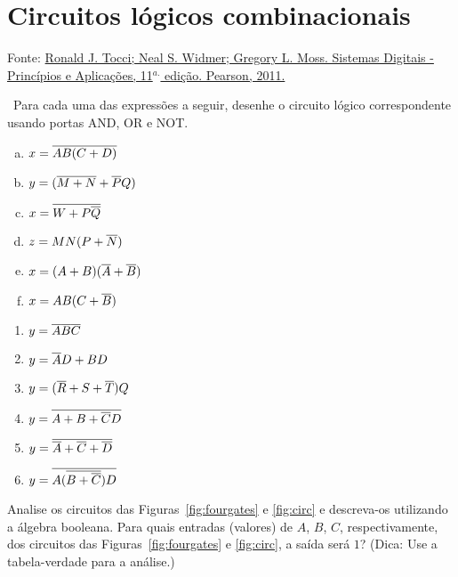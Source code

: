 \maketitle

\section*{Circuitos lógicos combinacionais}

\noindent Fonte:
\href{https://feituverava.bv3.digitalpages.com.br/users/publications/9788576059226/pages/_1}{Ronald
  J. Tocci; Neal S. Widmer; Gregory L. Moss. Sistemas Digitais -
  Princípios e Aplicações, 11$^{a.}$ edição. Pearson, 2011.}

\exercise~Para cada uma das expressões a seguir, desenhe o circuito
lógico correspondente usando portas AND, OR e NOT.

\begin{minipage}{.55\textwidth}
  \begin{enumerate}[(a),series=mylist]
  \item $x = \overline{AB(C+D)}$
  \item $y = (\overline{M+N}+\overline{P}Q)$
  \item $x=\overline{W+P\overline{Q}}$
  \item $z=MN(P+\overline{N})$
  \item $x=(A+B)(\overline{A}+\overline{B})$
  \item $x=AB(C+\overline{B})$
  \end{enumerate}
\end{minipage}
\begin{minipage}{.4\textwidth}
  \begin{enumerate}[resume*=mylist]
  \item $y=\overline{A}\overline{B}\overline{C}$
  \item $y=\overline{A}D+BD$
  \item $y=(\overline{R}+S+\overline{T})Q$
  \item $y=\overline{A+B+\overline{C}D}$
  \item $y=\overline{\overline{A}+\overline{C}+\overline{D}}$
  \item $y=\overline{A(\overline{B+\overline{C}})D}$
  \end{enumerate}
\end{minipage}


\exercise Analise os circuitos das Figuras~\ref{fig:fourgates} e
\ref{fig:circ} e descreva-os utilizando a álgebra booleana. Para quais
entradas (valores) de $A$, $B$, $C$, respectivamente, dos circuitos
das Figuras~\ref{fig:fourgates} e \ref{fig:circ}, a saída
será $1$? (Dica: Use a tabela-verdade para a análise.)\\

